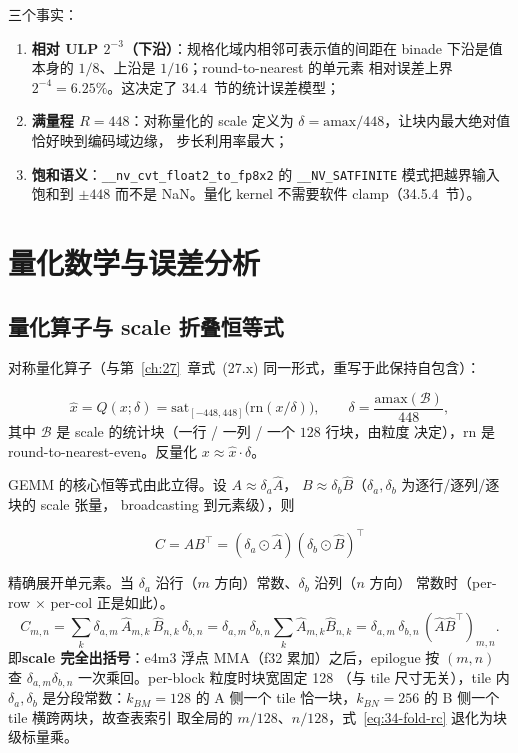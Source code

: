 三个事实：
\begin{enumerate}[itemsep=0pt,topsep=2pt]
  \item \textbf{相对 ULP $2^{-3}$（下沿）}：规格化域内相邻可表示值的间距在
        binade 下沿是值本身的 $1/8$、上沿是 $1/16$；round-to-nearest 的单元素
        相对误差上界 $2^{-4}=6.25\%$。这决定了 34.4~节的统计误差模型；
  \item \textbf{满量程 $R=448$}：对称量化的 scale 定义为
        $\delta = \mathrm{amax}/448$，让块内最大绝对值恰好映到编码域边缘，
        步长利用率最大；
  \item \textbf{饱和语义}：\texttt{\_\_nv\_cvt\_float2\_to\_fp8x2} 的
        \texttt{\_\_NV\_SATFINITE} 模式把越界输入饱和到 $\pm448$ 而不是
        NaN。量化 kernel 不需要软件 clamp（34.5.4~节）。
\end{enumerate}

\section{量化数学与误差分析}\label{sec:34-math}

\subsection{量化算子与 scale 折叠恒等式}

对称量化算子（与第~\ref{ch:27}~章式~(27.x) 同一形式，重写于此保持自包含）：

\begin{equation}
  \hat{x} = Q(x;\delta) = \mathrm{sat}_{[-448,448]}\!\big(\mathrm{rn}(x/\delta)\big),
  \qquad \delta = \frac{\mathrm{amax}(\mathcal{B})}{448},
  \label{eq:34-quant-op}
\end{equation}
其中 $\mathcal{B}$ 是 scale 的统计块（一行 / 一列 / 一个 $128$ 行块，由粒度
决定），$\mathrm{rn}$ 是 round-to-nearest-even。反量化 $x \approx \hat{x}\cdot\delta$。

GEMM 的核心恒等式由此立得。设 $A \approx \delta_a \hat{A}$，
$B \approx \delta_b \hat{B}$（$\delta_a,\delta_b$ 为逐行/逐列/逐块的 scale
张量， broadcasting 到元素级），则

\begin{equation}
  C = A B^{\top} = (\delta_a \odot \hat{A})(\delta_b \odot \hat{B})^{\top}
  \label{eq:34-fold}
\end{equation}

精确展开单元素。当 $\delta_a$ 沿行（$m$ 方向）常数、$\delta_b$ 沿列（$n$ 方向）
常数时（per-row $\times$ per-col 正是如此）。
\begin{equation}
  C_{m,n} = \sum_{k} \delta_{a,m}\,\hat{A}_{m,k}\,\hat{B}_{n,k}\,\delta_{b,n}
          = \delta_{a,m}\,\delta_{b,n} \sum_k \hat{A}_{m,k}\hat{B}_{n,k}
          = \delta_{a,m}\,\delta_{b,n}\,(\hat{A}\hat{B}^{\top})_{m,n}.
  \label{eq:34-fold-rc}
\end{equation}
即\textbf{scale 完全出括号}：e4m3 浮点 MMA（f32 累加）之后，epilogue 按
$(m,n)$ 查 $\delta_{a,m}\delta_{b,n}$ 一次乘回。per-block 粒度时块宽固定 128
（与 tile 尺寸无关），tile 内 $\delta_a,\delta_b$ 是分段常数：$k_{BM}{=}128$
的 A 侧一个 tile 恰一块，$k_{BN}{=}256$ 的 B 侧一个 tile 横跨两块，故查表索引
取全局的 $m/128$、$n/128$，式~\ref{eq:34-fold-rc} 退化为块级标量乘。

